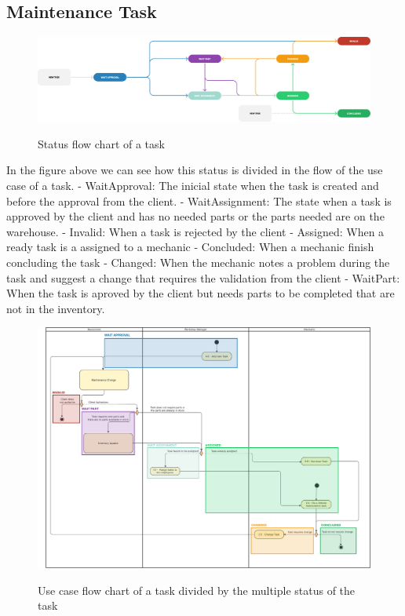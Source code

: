 \subsection{Maintenance Task} 


\begin{figure}[h]
  \caption{Status flow chart of a task}
  \centering
  \includegraphics[width=\textwidth]{figs/Status/MaintenanceTask/StatusDiagram}
  \label{fig:figure2}
\end{figure}


In the figure above we can see how this status is divided in the flow of the use case of a task.
- WaitApproval: The inicial state when the task is created and before the approval from the client.
- WaitAssignment: The state when a task is approved by the client and has no needed parts or the parts needed are on the warehouse. 
- Invalid: When a task is rejected by the client
- Assigned: When a ready task is a assigned to a mechanic
- Concluded: When a mechanic finish concluding the task
- Changed: When the mechanic notes a problem during the task and suggest a change that requires the validation from the client
- WaitPart: When the task is aproved by the client but needs parts to be completed that are not in the inventory.



\begin{figure}[h]
  \caption{Use case flow chart of a task divided by the multiple status of the task}
  \centering
  \includegraphics[width=\textwidth]{figs/Status/MaintenanceTask/UseCaseStatus}
  \label{fig:figure2}
\end{figure}

